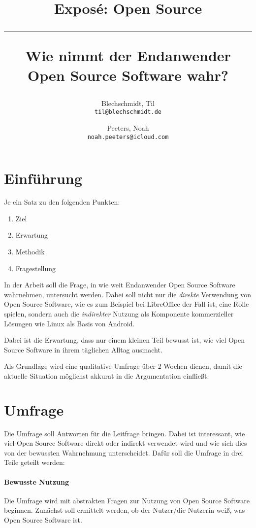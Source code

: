 \documentclass[a4paper]{article}
\title{Exposé: Open Source \\
    \noindent\rule[0.25ex]{\linewidth}{0.5pt}
    \large Wie nimmt der Endanwender Open Source Software wahr?
}
\author{
  Blechschmidt, Til\\
  \texttt{til@blechschmidt.de}
  \and
  Peeters, Noah\\
  \texttt{noah.peeters@icloud.com}
}
\begin{document}
	\thispagestyle{fancy}
	\maketitle
	\clearpage
	
	\section{Einführung}
	   Je ein Satz zu den folgenden Punkten:
	   \begin{enumerate}
	       \item Ziel
	       \item Erwartung
	       \item Methodik
	       \item Fragestellung
	   \end{enumerate}
	
	   In der Arbeit soll die Frage, in wie weit Endanwender Open Source Software wahrnehmen, untersucht werden. Dabei soll nicht nur die \emph{direkte} Verwendung von Open Source Software, wie es zum Beispiel bei LibreOffice der Fall ist, eine Rolle spielen, sondern auch die \emph{indirekter} Nutzung als Komponente kommerzieller Lösungen wie Linux als Basis von Android.
	   
	   Dabei ist die Erwartung, dass nur einem kleinen Teil bewusst ist, wie viel Open Source Software in ihrem täglichen Alltag ausmacht.
	   
	   Als Grundlage wird eine qualitative Umfrage über 2 Wochen dienen, damit die aktuelle Situation möglichst akkurat in die Argumentation einfließt.
	   
	\clearpage
	
	\section{Umfrage}
	   Die Umfrage soll Antworten für die Leitfrage bringen. Dabei ist interessant, wie viel Open Source Software direkt oder indirekt verwendet wird und wie sich dies von der bewussten Wahrnehmung unterscheidet. Dafür soll die Umfrage in drei Teile geteilt werden:
	   
	   \paragraph{Bewusste Nutzung}
	       Die Umfrage wird mit abstrakten Fragen zur Nutzung von Open Source Software beginnen. Zunächst soll ermittelt werden, ob der Nutzer/die Nutzerin weiß, was Open Source Software ist.
	       
\end{document}
